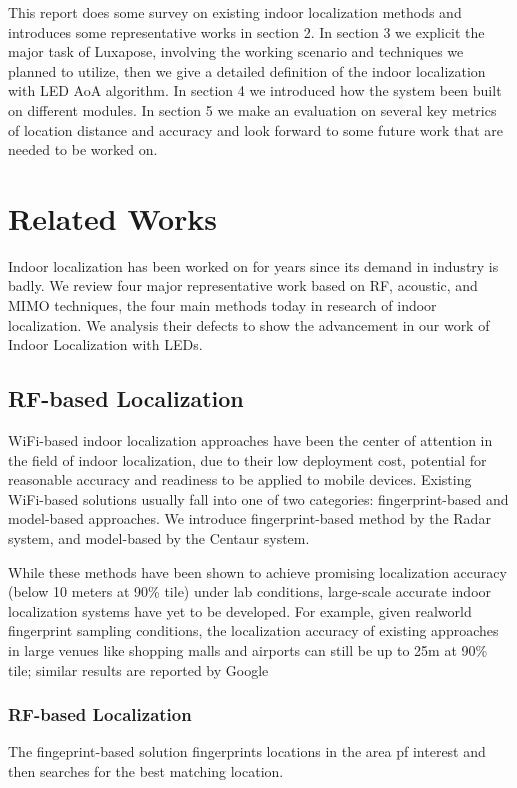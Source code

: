 \documentclass[a4paper, 11pt]{article} %
\begin{document}
 

This report does some survey on existing indoor localization methods and introduces some representative works in section 2. In section 3 we explicit the major task of Luxapose, involving the working scenario and techniques we planned to utilize, then we give a detailed definition of the indoor localization with LED AoA algorithm. In section 4 we introduced how the system been built on different modules. In section 5 we make an evaluation on several key metrics of location distance and accuracy and look forward to some future work that are needed to be worked on.


\section{Related Works}
Indoor localization has been worked on for years since its demand in industry is badly. We review four major representative work based on RF, acoustic, and MIMO techniques, the four main methods today in research of indoor localization. We analysis their defects to show the advancement in our work of Indoor Localization with LEDs.

\subsection{RF-based Localization \cite{Radar00} \cite{Centaur12}}
WiFi-based indoor localization approaches have been the center of attention in the field of indoor localization, due to their low deployment cost, potential for reasonable accuracy and readiness to be applied to mobile devices. Existing WiFi-based solutions usually fall into one of two categories: fingerprint-based and model-based approaches. We introduce fingerprint-based method by the Radar system, and model-based by the Centaur system.

While these methods have been shown to achieve promising localization accuracy (below 10 meters at 90\% tile) under lab conditions, large-scale accurate indoor localization systems have yet to be developed. For example, given realworld fingerprint sampling conditions, the localization accuracy of existing approaches in large venues like shopping malls and airports can still be up to 25m at 90\% tile; similar results are reported by Google\cite{google}

\subsubsection{RF-based Localization \cite{Radar00}}
The fingeprint-based solution fingerprints locations in the area pf interest and then searches for the best matching location.
\end{document}

